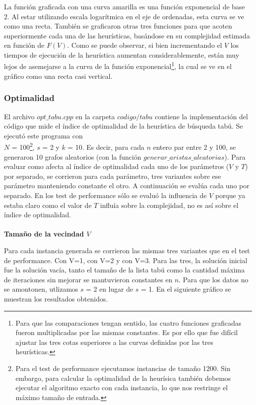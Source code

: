 \par{La función graficada con una curva amarilla es una función exponencial de
base 2. Al estar utilizando escala logarítmica en el eje de ordenadas, esta curva
se ve como una recta. También se graficaron otras tres funciones para que acoten
superiormente cada una de las heurísticas, basándose en su complejidad estimada
en función de $F(V)$. Como se puede observar, si bien incrementando el $V$ los
tiempos de ejecución de la heurística aumentan considerablemente, están muy
lejos de asemejarse a la curva de la función exponencial\footnote{Para que
las comparaciones tengan sentido, las cuatro funciones graficadas fueron
multiplicadas por las mismas constantes. Es por ello que fue difícil ajustar
las tres cotas superiores a las curvas definidas por las tres heurísticas.},
la cual se ve en el gráfico como una recta casi vertical.}

\subsubsection{Optimalidad}

\par{El archivo $opt\_tabu.cpp$ en la carpeta $codigo/tabu$ contiene la
implementación del código que mide el índice de optimalidad de la heurística
de búsqueda tabú. Se ejecutó este programa con\\$N$ = 100\footnote{Para el test
de performance ejecutamos instancias de tamaño 1200. Sin embargo, para calcular
la optimalidad de la heurísica también debemos ejecutar el algoritmo exacto
con cada instancia, lo que nos restringe el máximo tamaño de entrada.},
$s$ = 2 y $k$ = 10. Es decir, para cada $n$ entero par entre 2 y 100, se
generaron 10 grafos aleatorios (con la función $generar\_aristas\_aleatorias$).
Para evaluar como afecta al índice de optimalidad cada uno de los parámetros
($V$ y $T$) por separado, se corrieron para cada parámetro, tres variantes
sobre ese parámetro manteniendo constante el otro. A continuación se
evalúa cada uno por separado. En los test de performance sólo se evaluó la
influencia de $V$ porque ya estaba claro como el valor de $T$
influía sobre la complejidad, no es así sobre el índice de optimalidad.}
\\\\
\textbf{Tamaño de la vecindad $V$}\\

\par{Para cada instancia generada se corrieron las mismas tres variantes que
en el test de performance. Con V=1, con V=2 y con V=3. Para las tres, la
solución inicial fue la solución vacía, tanto el tamaño de la lista tabú
como la cantidad máxima de iteraciones sin mejorar se mantuvieron constantes en
$n$. Para que los datos no se amontonen, utlizamos $s$ = 2 en lugar de $s$ = 1.
En el siguiente gráfico se muestran los resultados obtenidos.}

